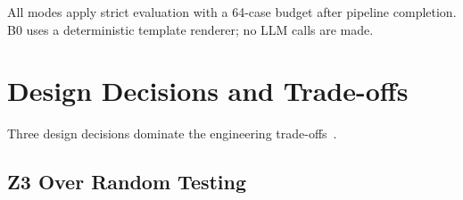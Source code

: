 \begin{table}[H]
  \caption{Execution mode configuration matrix.  Flags control which
           pipeline stages are active; numeric parameters tune per-stage
           behaviour.  All LLM-based modes use Qwen2.5-27B-Instruct (\textsf{Qwen-27B})
           with $K = 3$ unless noted.
           $N_{\max}$ is the per-scenario formal case cap.}
  \label{tab:impl-modes}
  \centering
  \par\smallskip
  \raggedright\footnotesize All modes apply strict evaluation with a
  64-case budget after pipeline completion.
  B0 uses a deterministic template renderer; no LLM calls are made.
\end{table}

\section{Design Decisions and Trade-offs}
\label{sec:impl:tradeoffs}

Three design decisions dominate the engineering trade-offs~\citep{woodcock2009formalsurvey}.

\subsection{Z3 Over Random Testing}

